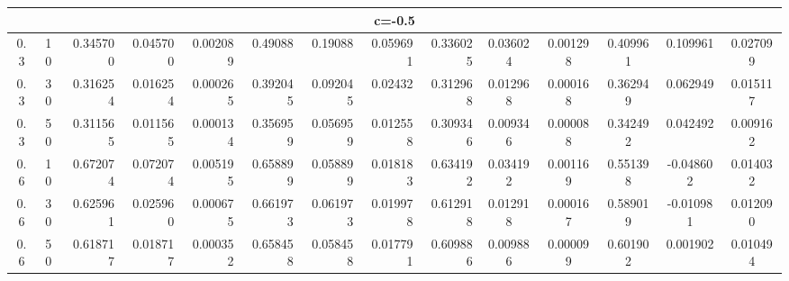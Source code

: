 \documentclass[11pt,a4paper]{article}
\numberwithin{equation}{section}
\begin{document}
\begin{landscape}
\begin{table}[htbp]
\begin{tabular}{cc|rrr|rrr|rcc|ccc}
				\multicolumn{14}{c}{                                      c=-0.5} \\

				\midrule

				0.3   & 10    & 0.345700 & 0.045700 & 0.002089 & 0.49088 & 0.19088 & 0.059691 & 0.336025 & 0.036024 & 0.001298 & 0.409961 & 0.109961 & 0.027099 \\

				0.3   & 30    & 0.316254 & 0.016254 & 0.000265 & 0.392045 & 0.092045 & 0.02432 & 0.312968 & 0.012968 & 0.000168 & 0.362949 & 0.062949 & 0.015117 \\

				0.3   & 50    & 0.311565 & 0.011565 & 0.000134 & 0.356959 & 0.056959 & 0.012558 & 0.309346 & 0.009346 & 0.000088 & 0.342492 & 0.042492 & 0.009162 \\

				0.6   & 10    & 0.672074 & 0.072074 & 0.005195 & 0.658899 & 0.058899 & 0.018183 & 0.634192 & 0.034192 & 0.001169 & 0.551398 & -0.048602 & 0.014032 \\

				0.6   & 30    & 0.625961 & 0.025960 & 0.000675 & 0.661973 & 0.061973 & 0.019978 & 0.612918 & 0.012918 & 0.000167 & 0.589019 & -0.010981 & 0.012090 \\

				0.6   & 50    & 0.618717 & 0.018717 & 0.000352 & 0.658458 & 0.058458 & 0.017791 & 0.609886 & 0.009886 & 0.000099 & 0.601902 & 0.001902 & 0.010494 \\

				\bottomrule

			\end{tabular}%

			\label{os.ge}%

		\end{table}%

		

	\end{landscape}	
\end{document}

